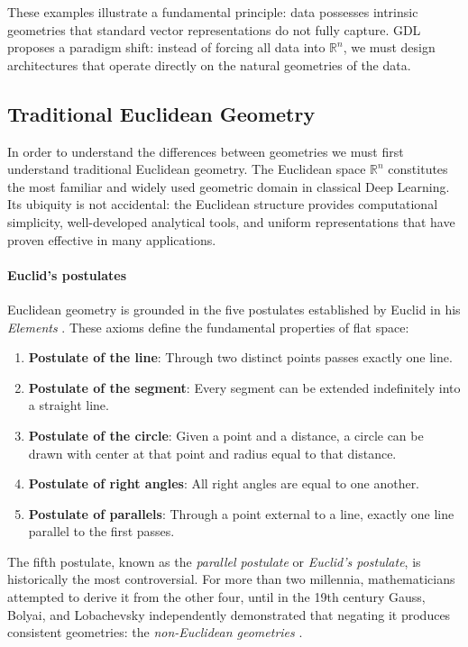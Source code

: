 These examples illustrate a fundamental principle: data possesses intrinsic geometries that standard vector representations do not fully capture. \gls{GDL} proposes a paradigm shift: instead of forcing all data into $\mathbb{R}^n$, we must design architectures that operate directly on the natural geometries of the data.

\subsection{Traditional Euclidean Geometry}\label{subsec:geometria_euclidiana}

In order to understand the differences between geometries we must first understand traditional Euclidean geometry. The Euclidean space $\mathbb{R}^n$ constitutes the most familiar and widely used geometric domain in classical Deep Learning. Its ubiquity is not accidental: the Euclidean structure provides computational simplicity, well-developed analytical tools, and uniform representations that have proven effective in many applications.

\paragraph{Euclid's postulates}

Euclidean geometry is grounded in the five postulates established by Euclid in his \textit{Elements} \citep{euclid1956elements}. These axioms define the fundamental properties of flat space:

\begin{enumerate}
    \item \textbf{Postulate of the line}: Through two distinct points passes exactly one line.
    \item \textbf{Postulate of the segment}: Every segment can be extended indefinitely into a straight line.
    \item \textbf{Postulate of the circle}: Given a point and a distance, a circle can be drawn with center at that point and radius equal to that distance.
    \item \textbf{Postulate of right angles}: All right angles are equal to one another.
    \item \textbf{Postulate of parallels}: Through a point external to a line, exactly one line parallel to the first passes.
\end{enumerate}

The fifth postulate, known as the \textit{parallel postulate} or \textit{Euclid's postulate}, is historically the most controversial. For more than two millennia, mathematicians attempted to derive it from the other four, until in the 19th century Gauss, Bolyai, and Lobachevsky independently demonstrated that negating it produces consistent geometries: the \textit{non-Euclidean geometries} \citep{gray2007worlds}.

